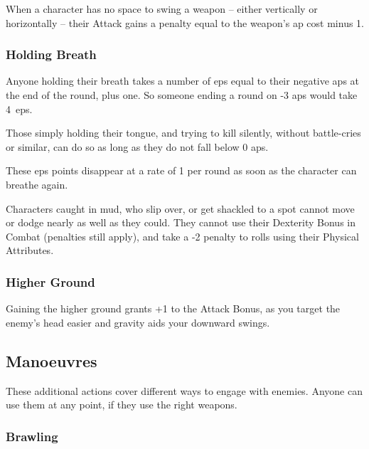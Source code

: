 \begin{multicols}{2}
When a character has no space to swing a weapon -- either vertically or horizontally -- their Attack gains a penalty equal to the weapon's \gls{ap} cost minus 1.

\subsubsection[Holding Breath: 1 \glsentrytext{ep} per negative \glsentrytext{ap} at the end of the round, plus 1~per round]{Holding Breath}
\label{holdingBreath}

Anyone holding their breath takes a number of \glspl{ep} equal to their negative \glspl{ap} at the end of the round, plus one.
So someone ending a round on -3 \glspl{ap} would take 4~\glspl{ep}.

Those simply holding their tongue, and trying to kill silently, without battle-cries or similar, can do so as long as they do not fall below 0 \glspl{ap}.

These \glspl{ep} points disappear at a rate of 1 per round as soon as the character can breathe again.

\label{trapped}
\label{prone}

Characters caught in mud, who slip over, or get shackled to a spot cannot move or dodge nearly as well as they could.
They cannot use their Dexterity Bonus in Combat (penalties still apply), and take a -2 penalty to rolls using their Physical Attributes.

\subsubsection[+1 to attack]{Higher Ground}

Gaining the higher ground grants +1 to the Attack Bonus, as you target the enemy's head easier and gravity aids your downward swings.

\subsection{Manoeuvres}

These additional actions cover different ways to engage with enemies.
Anyone can use them at any point, if they use the right weapons.

\subsubsection[Brawling: Make a normal attack roll, but any attack with a Margin less than 5 only inflicts \glspl{ep} rather than Damage]{Brawling}


\end{multicols}
